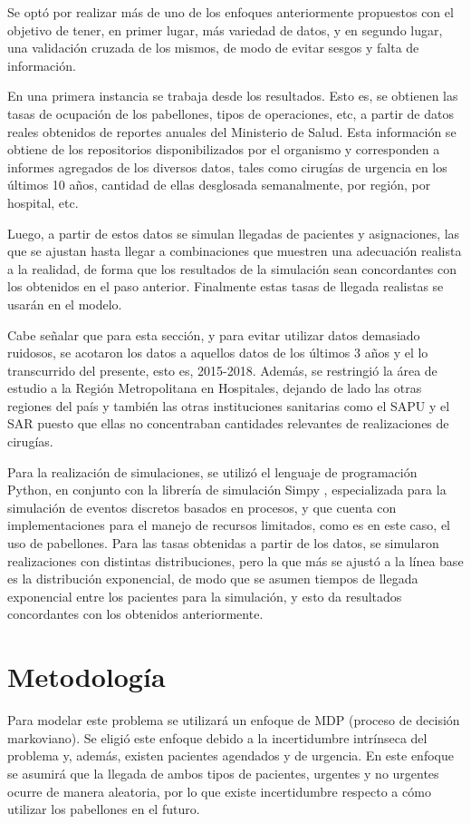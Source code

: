 \documentclass[letterpaper,10pt]{article}
\begin{document}
Se optó por realizar más de uno de los enfoques anteriormente propuestos con el objetivo de tener, en primer lugar, más variedad de datos, y en segundo lugar, una validación cruzada de los mismos, de modo de evitar sesgos y falta de información.

En una primera instancia se trabaja desde los resultados. Esto es, se obtienen las tasas de ocupación de los pabellones, tipos de operaciones, etc, a partir de datos reales obtenidos de reportes anuales del Ministerio de Salud. Esta información se obtiene de los repositorios disponibilizados por el organismo \cite{minsal} y corresponden a informes agregados de los diversos datos, tales como cirugías de urgencia en los últimos 10 años, cantidad de ellas desglosada semanalmente, por región, por hospital, etc.

Luego, a partir de estos datos se simulan llegadas de pacientes y asignaciones, las que se ajustan hasta llegar a combinaciones que muestren una adecuación realista a la realidad, de forma que los resultados de la simulación sean concordantes con los obtenidos en el paso anterior. Finalmente estas tasas de llegada realistas se usarán en el modelo.

Cabe señalar que para esta sección, y para evitar utilizar datos demasiado ruidosos, se acotaron los datos a aquellos datos de los últimos 3 años y el lo transcurrido del presente, esto es, 2015-2018. Además, se restringió la área de estudio a la Región Metropolitana en Hospitales, dejando de lado las otras regiones del país y también las otras instituciones sanitarias como el SAPU y el SAR puesto que ellas no concentraban cantidades relevantes de realizaciones de cirugías.

Para la realización de simulaciones, se utilizó el lenguaje de programación Python, en conjunto con la librería de simulación Simpy \cite{simpy}, especializada para la simulación de eventos discretos basados en procesos, y que cuenta con implementaciones para el manejo de recursos limitados, como es en este caso, el uso de pabellones. Para las tasas obtenidas a partir de los datos, se simularon realizaciones con distintas distribuciones, pero la que más se ajustó a la línea base es la distribución exponencial, de modo que se asumen tiempos de llegada exponencial entre los pacientes para la simulación, y esto da resultados concordantes con los obtenidos anteriormente. 

\section*{Metodología}
Para modelar este problema se utilizará un enfoque de MDP (proceso de decisión markoviano). Se eligió este enfoque debido a la incertidumbre intrínseca del problema y, además, existen pacientes agendados y de urgencia. En este enfoque se asumirá que la llegada de ambos tipos de pacientes, urgentes y no urgentes ocurre de manera aleatoria, por lo que existe incertidumbre respecto a cómo utilizar los pabellones en el futuro.
\end{document}
